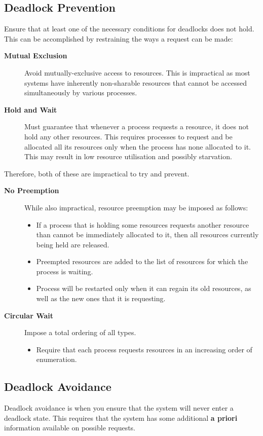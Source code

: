\documentclass[11pt]{article}
\begin{document}
\subsection{Deadlock Prevention}
\label{sec:org7b91dfe}
Ensure that at least one of the necessary conditions for deadlocks does not hold.
This can be accomplished by restraining the ways a request can be made:
\begin{description}
\item[{\textbf{Mutual Exclusion}}] Avoid mutually-exclusive access to resources. This is impractical as most systems have inherently non-sharable resources that cannot be accessed simultaneously by various processes.
\item[{\textbf{Hold and Wait}}] Must guarantee that whenever a process requests a resource, it does not hold any other resources. This requires processes to request and be allocated all its resources only when the process has none allocated to it. This may result in low resource utilisation and possibly starvation.
\end{description}
Therefore, both of these are impractical to try and prevent. 
\begin{description}
\item[{\textbf{No Preemption}}] While also impractical, resource preemption may be imposed as follows:
\begin{itemize}
\item If a process that is holding some resources requests another resource than cannot be immediately allocated to it, then all resources currently being held are released.
\item Preempted resources are added to the list of resources for which the process is waiting.
\item Process will be restarted only when it can regain its old resources, as well as the new ones that it is requesting.
\end{itemize}
\item[{\textbf{Circular Wait}}] Impose a total ordering of all types.
\begin{itemize}
\item Require that each process requests resources in an increasing order of enumeration.
\end{itemize}
\end{description}

\subsection{Deadlock Avoidance}
\label{sec:org90395a0}
   Deadlock avoidance is when you ensure that the system will never enter a deadlock state. 
This requires that the system has some additional \textbf{a priori} information available on possible requests.
\end{document}
